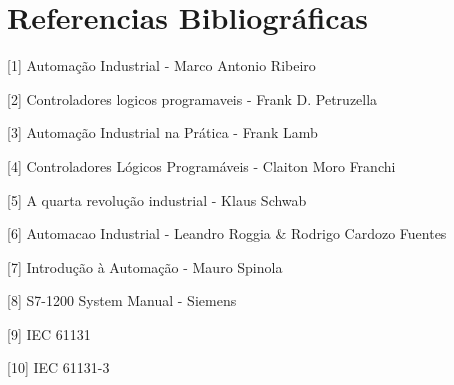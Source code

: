 \documentclass[a4paper, 12pt]{article}
\begin{document}
\section{Referencias Bibliográficas}

[1] Automação Industrial - Marco Antonio Ribeiro

[2] Controladores logicos programaveis - Frank D. Petruzella

[3] Automação Industrial na Prática - Frank Lamb

[4] Controladores Lógicos Programáveis - Claiton Moro Franchi

[5] A quarta revolução industrial - Klaus Schwab

[6] Automacao Industrial - Leandro Roggia \& Rodrigo Cardozo Fuentes

[7] Introdução à Automação - Mauro Spinola

[8] S7-1200 System Manual - Siemens

[9] IEC 61131

[10] IEC 61131-3
\end{document}

